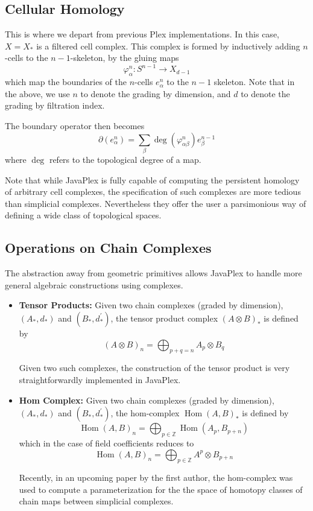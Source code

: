 \documentclass[10pt]{article}
\newcommand{\Hom}{\operatorname{Hom}}
\begin{document}
\subsection{Cellular Homology}

This is where we depart from previous Plex implementations. In this case, $X = X_*$ is a filtered cell complex. This complex is formed by inductively adding $n$-cells to the $n-1$-skeleton, by the gluing maps 
$$\varphi_{\alpha}^n: S^{n-1} \rightarrow X_{d-1}$$
which map the boundaries of the $n$-cells $e_{\alpha}^n$ to the $n-1$ skeleton. Note that in the above, we use $n$ to denote the grading by dimension, and $d$ to denote the grading by filtration index.

The boundary operator then becomes 
$$\partial(e_{\alpha}^n) = \sum_{\beta} \deg(\varphi_{\alpha \beta}^n) e_{\beta}^{n-1}$$
where $\deg$ refers to the topological degree of a map.

Note that while JavaPlex is fully capable of computing the persistent homology of arbitrary cell complexes, the specification of such complexes are more tedious than simplicial complexes. Nevertheless they offer the user a parsimonious way of defining a wide class of topological spaces.

\subsection{Operations on Chain Complexes}

The abstraction away from geometric primitives allows JavaPlex to handle more general algebraic constructions using complexes.

\begin{itemize}
\item {\bf Tensor Products:} Given two chain complexes (graded by dimension), $(A_*, d_*)$ and $(B_*, d^{\prime}_*)$, the tensor product complex $(A \otimes B)_*$ is defined by
$$(A \otimes B)_n = \bigoplus_{p + q = n} A_p \otimes B_q$$

Given two such complexes, the construction of the tensor product is very straightforwardly implemented in JavaPlex. 

\item {\bf Hom Complex:} Given two chain complexes (graded by dimension), $(A_*, d_*)$ and $(B_*, d^{\prime}_*)$, the hom-complex $\Hom(A,B)_*$ is defined by
$$\Hom(A, B)_n = \bigoplus_{p \in \mathbb{Z}} \Hom(A_p, B_{p + n})$$
which in the case of field coefficients reduces to 
$$\Hom(A, B)_n = \bigoplus_{p \in \mathbb{Z}} A^p \otimes B_{p + n}$$

Recently, in an upcoming paper by the first author, the hom-complex was used to compute a parameterization for the the space of homotopy classes of chain maps between simplicial complexes.


\end{itemize}
\end{document}
